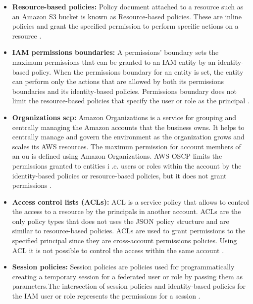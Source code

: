 \begin{itemize}
    \item \textbf{Resource-based policies:} Policy document attached to a resource such as an Amazon S3 bucket is known as Resource-based policies.
    These are inline policies and grant the specified permission to perform specific actions on a resource \cite{27}.
\end{itemize}
\begin{itemize}
    \item \textbf{IAM permissions boundaries:} A permissions' boundary sets the maximum permissions that can be granted to an IAM entity by an identity-based policy.
     When the permissions boundary for an entity is set, the entity can perform only the actions that are allowed by both its permissions boundaries and its identity-based policies.
     Permissions boundary does not limit the
    resource-based policies that specify the user or role as the principal \cite{27}.
\end{itemize}
\begin{itemize}
    \item \textbf{Organizations \gls{scp}:} Amazon
    Organizations
    is a service for grouping and centrally managing the Amazon accounts that the business owns.
    It helps to centrally manage and govern the environment as the organization grows and scales its AWS resources.
    The maximun permission for account members of an
    \gls{ou} is defined using
    Amazon
    Organizations.
    AWS OSCP limits the permissions granted to entities i
    .e. users or roles within the account by the
    identity-based policies or resource-based policies,
    but it does not grant permissions \cite{27}.

\end{itemize}
\begin{itemize}
    \item \textbf{Access control lists (ACLs):} ACL is a service policy that allows to control the access to a resource by the principals in another account.
    ACLs are the only policy types that does not uses the JSON policy structure and are similar to resource-based policies.
    ACLs are used to grant permissions to the specified principal since they are cross-account permissions policies.
    Using ACL it is not possible to control the access within the same account \cite{27}.
\end{itemize}
\begin{itemize}
    \item \textbf{Session policies:} Session policies are
    policies used for programmatically creating a temporary session for a federated user or role by passing them as parameters.The intersection of session policies and identity-based policies for the IAM user or role represents the permissions for a session \cite{27}.
\end{itemize}

